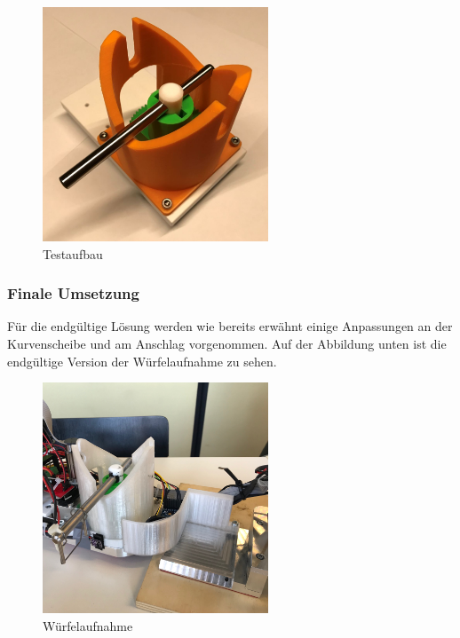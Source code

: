 \documentclass[../../main.tex]{subfiles}
\begin{document}
        \begin{figure}[H]
            \centering
            \includegraphics[width=0.6\textwidth]{Kran/Testaufbau.JPG}
            \caption {Testaufbau}
        \end{figure}
        
        \subsubsection{Finale Umsetzung}
        Für die endgültige Lösung werden wie bereits erwähnt einige Anpassungen an der Kurvenscheibe und am Anschlag vorgenommen. Auf der Abbildung unten ist die endgültige Version der Würfelaufnahme zu sehen. 

        \begin{figure}[H]
            \centering
            \includegraphics[width=0.6\textwidth]{Finale_loesung.JPG}
            \caption {Würfelaufnahme}
        \end{figure}
\end{document}
